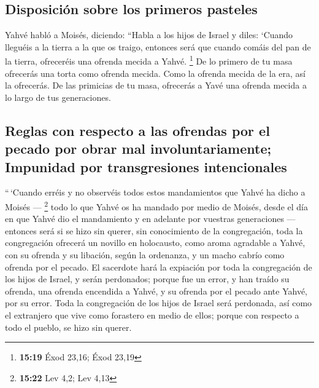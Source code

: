 \hypertarget{disposiciuxf3n-sobre-los-primeros-pasteles}{%
\subsection{Disposición sobre los primeros
pasteles}\label{disposiciuxf3n-sobre-los-primeros-pasteles}}

 Yahvé habló a Moisés, diciendo:  ``Habla
a los hijos de Israel y diles: `Cuando lleguéis a la tierra a la que os
traigo,  entonces será que cuando comáis del pan de la
tierra, ofreceréis una ofrenda mecida a Yahvé. \footnote{\textbf{15:19}
  Éxod 23,16; Éxod 23,19}  De lo primero de tu masa
ofrecerás una torta como ofrenda mecida. Como la ofrenda mecida de la
era, así la ofrecerás.  De las primicias de tu masa,
ofrecerás a Yavé una ofrenda mecida a lo largo de tus generaciones.

\hypertarget{reglas-con-respecto-a-las-ofrendas-por-el-pecado-por-obrar-mal-involuntariamente-impunidad-por-transgresiones-intencionales}{%
\subsection{Reglas con respecto a las ofrendas por el pecado por obrar
mal involuntariamente; Impunidad por transgresiones
intencionales}\label{reglas-con-respecto-a-las-ofrendas-por-el-pecado-por-obrar-mal-involuntariamente-impunidad-por-transgresiones-intencionales}}

 ``\,`Cuando erréis y no observéis todos estos
mandamientos que Yahvé ha dicho a Moisés --- \footnote{\textbf{15:22}
  Lev 4,2; Lev 4,13}  todo lo que Yahvé os ha mandado por
medio de Moisés, desde el día en que Yahvé dio el mandamiento y en
adelante por vuestras generaciones ---  entonces será si
se hizo sin querer, sin conocimiento de la congregación, toda la
congregación ofrecerá un novillo en holocausto, como aroma agradable a
Yahvé, con su ofrenda y su libación, según la ordenanza, y un macho
cabrío como ofrenda por el pecado.  El sacerdote hará la
expiación por toda la congregación de los hijos de Israel, y serán
perdonados; porque fue un error, y han traído su ofrenda, una ofrenda
encendida a Yahvé, y su ofrenda por el pecado ante Yahvé, por su error.
 Toda la congregación de los hijos de Israel será
perdonada, así como el extranjero que vive como forastero en medio de
ellos; porque con respecto a todo el pueblo, se hizo sin querer.

